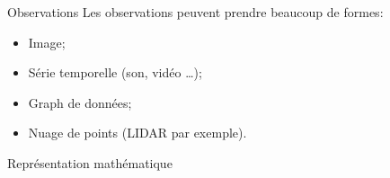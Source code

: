 \documentclass[8pt]{beamer}
\begin{document}
		\begin{frame}{Observations}
			Les observations peuvent prendre beaucoup de formes:
			\begin{itemize}
				\item<2-> Image;
				\item<3-> Série temporelle (son, vidéo \dots);
				\item<4-> Graph de données;
				\item<5-> Nuage de points (LIDAR par exemple).
			\end{itemize}
		\end{frame}

		\begin{frame}{Représentation mathématique}
			\begin{frame}
				\item<1-> 
			\end{frame}
		\end{frame}



\end{document}
